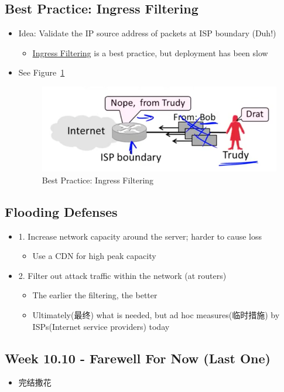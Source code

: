 \documentclass[12pt]{ctexart}   %
\begin{document}
	\subsection{Best Practice: Ingress Filtering}
	\begin{itemize}
		\item Idea: Validate the IP source address of packets at ISP boundary (Duh!)
		\begin{itemize}
			\item \underline{Ingress Filtering} is a best practice, but deployment has been slow
		\end{itemize}
		\item See Figure~\ref{fig:10-9-6}
		  
		\begin{figure}[h!] %
		\centering
		\includegraphics[scale=0.7]{images/10-9-6}
		\caption{Best Practice: Ingress Filtering}
		\label{fig:10-9-6}
		\end{figure}
	\end{itemize}

	\subsection{Flooding Defenses}
	\begin{itemize}
		\item {\color{blue} 1.} Increase network capacity around the server; harder to cause loss
		\begin{itemize}
			\item Use a CDN for high peak capacity
		\end{itemize}

		\item {\color{blue} 2.} Filter out attack traffic within the network (at routers)
		\begin{itemize}
			\item The earlier the filtering, the better
			\item Ultimately(最终) what is needed, but ad hoc measures(临时措施) by ISPs(Internet service providers) today
		\end{itemize}
	\end{itemize}

\subsection{Week 10.10 - Farewell For Now (Last One)}
	\begin{itemize}
		\item 完结撒花
	\end{itemize}
\end{document}
